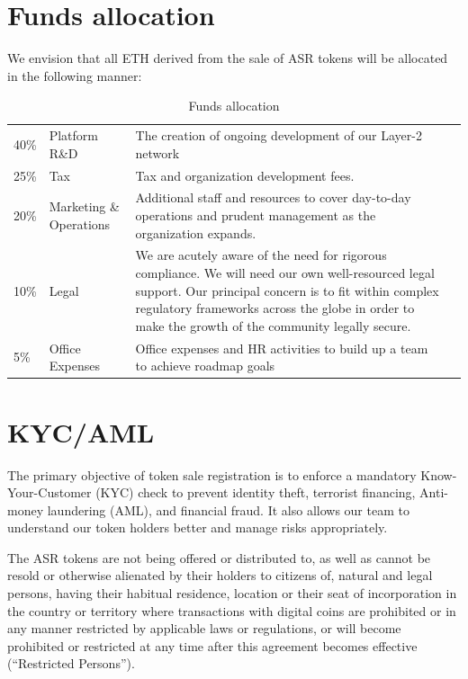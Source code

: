 \section{Funds allocation}

We envision that all ETH derived from the sale of ASR tokens will be allocated in the following manner:
\newline\newline


\begin{table}[H]
\begin{tabular}{llp{}l}
  40\% & Platform R\&D & The creation of ongoing development of our Layer-2 network \\
  25\% & Tax & Tax and organization development fees.\\
  20\% & Marketing \& Operations & Additional staff and resources to cover day-to-day operations and prudent management as the organization expands. \\
  10\% & Legal & We are acutely aware of the need for rigorous compliance. We will need our own well-resourced legal support. Our principal concern is to fit within complex regulatory frameworks across the globe in order to make the growth of the community legally secure. \\

  5\% & Office Expenses & Office expenses and HR activities to build up
        a team to achieve roadmap goals
\end{tabular}
\caption{\label{tab:table-name}Funds allocation}
\end{table}

\section{KYC/AML}

The primary objective of token sale registration is to enforce a mandatory Know-Your-Customer (KYC) check to prevent identity theft, terrorist financing, Anti-money laundering (AML), and financial fraud. It also allows our team to understand our token holders better and manage risks appropriately.

The ASR tokens are not being offered or distributed to, as well as cannot be resold or otherwise alienated by their holders to citizens of, natural and legal persons, having their habitual residence, location or their seat of incorporation in the country or territory where transactions with digital coins are prohibited or in any manner restricted by applicable laws or regulations, or will become prohibited or restricted at any time after this agreement becomes effective (“Restricted Persons”).


